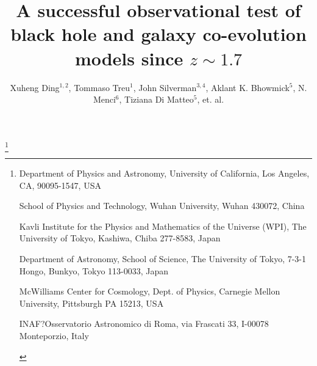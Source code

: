 \documentclass{natureprintstyle}
\title{
A successful observational test of black hole and galaxy co-evolution models since $z\sim1.7$
}
\author{Xuheng Ding$^{1,2}$, 
Tommaso Treu$^{1}$, 
John Silverman$^{3, 4}$,
Aklant K. Bhowmick$^{5}$,
N. Menci$^{6}$,
Tiziana Di Matteo$^{5}$,
et. al.
}
\begin{document}
\maketitle

\let\thefootnote\relax\footnote{
\begin{affiliations}
\item {Department of Physics and Astronomy, University of California, Los Angeles, CA, 90095-1547, USA} 
\item {School of Physics and Technology, Wuhan University, Wuhan 430072, China}
\item {Kavli Institute for the Physics and Mathematics of the Universe (WPI), The University of Tokyo, Kashiwa, Chiba 277-8583, Japan}
\item {Department of Astronomy, School of Science, The University of Tokyo, 7-3-1 Hongo, Bunkyo, Tokyo 113-0033, Japan}
\item{McWilliams Center for Cosmology, Dept. of Physics, Carnegie Mellon University, Pittsburgh PA 15213, USA}
\item{INAF?Osservatorio Astronomico di Roma, via Frascati 33, I-00078 Monteporzio, Italy}
\end{affiliations}
}
\end{document}
